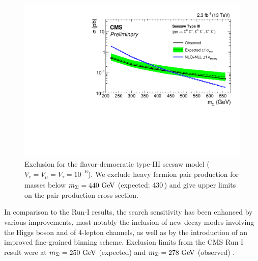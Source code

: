 \begin{figure}[t]
\begin{center}
	\includegraphics[width=.8\textwidth]{Results/exclusion}
	\caption{Exclusion for the flavor-democratic type-III seesaw model ($V_e = V_\mu = V_\tau = 10^{-6}$). We exclude heavy fermion pair production for masses below $m_\Sigma = 440\,\,\text{Ge\hspace{-.08em}V}$ (expected: 430\,\GeV) and give upper limits on the pair production cross section.
	\label{fig:exclusion}}
\end{center}
\end{figure}

In comparison to the Run-I results, the search sensitivity has been enhanced by various improvements, most notably the inclusion of new decay modes involving the Higgs boson and of 4-lepton channels, as well as by the introduction of an improved fine-grained binning scheme. Exclusion limits from the CMS Run I result were at $m_\Sigma = 250\,\,\text{Ge\hspace{-.08em}V}$ (expected) and $m_\Sigma = 278\,\,\text{Ge\hspace{-.08em}V}$ (observed) \cite{CMS-PAS-EXO-14-001}.
